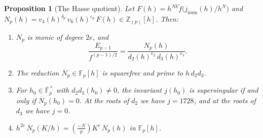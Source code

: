 \documentclass[11pt,a4paper]{article}
\newtheorem{proposition}[theorem]{Proposition}
\theoremstyle{definition}
\theoremstyle{remark}
\newcommand{\F}{\mathbb{F}}
\newcommand{\Z}{\mathbb{Z}}
\newcommand{\Fpbar}{\overline{\F}_p}
\newcommand{\leg}[2]{\left(\frac{#1}{#2}\right)}
\newcommand{\Zp}{\Z_{(p)}}
\numberwithin{equation}{section}
\begin{document}
\begin{proposition}[The Hasse quotient]\label{prop:Np}
Let $F(h)=h^{Nk}\tilde f\bigl(j_{\mathrm{num}}(h)/h^N\bigr)$ and
$N_p(h)=v_4(h)^{\delta_p}\,v_6(h)^{\varepsilon_p}\,F(h)\in\Zp[h]$. Then:
\begin{enumerate}
\item[(a)] $N_p$ is monic of degree $2e$, and
\begin{equation}\label{eq:Rp}
\frac{E_{p-1}}{f^{(p-1)/2}}=\frac{N_p(h)}{d_2(h)^{e_2}\,d_3(h)^{e_3}} .
\end{equation}
\item[(b)] The reduction $\overline N_p\in\F_p[h]$ is squarefree and prime to
$h\,d_2d_3$.
\item[(c)] For $h_0\in\Fpbar^\times$ with $d_2d_3(h_0)\ne0$, the invariant
$j(h_0)$ is supersingular if and only if $\overline N_p(h_0)=0$. At the roots
of $d_2$ we have $j=1728$, and at the roots of $d_3$ we have $j=0$.
\item[(d)] $h^{2e}\,\overline N_p(K/h)=\leg{-N}{p}K^e\,\overline N_p(h)$ in
$\F_p[h]$.
\end{enumerate}
\end{proposition}
\end{document}
